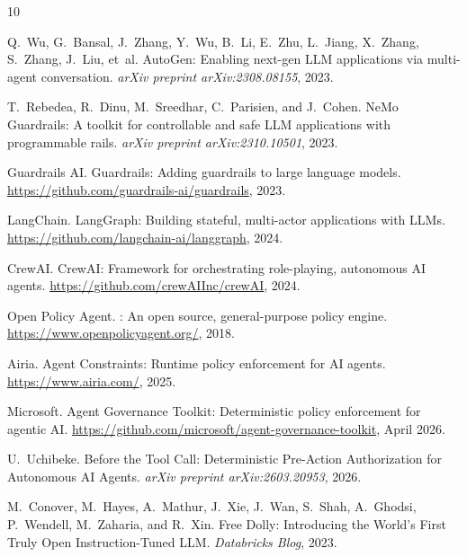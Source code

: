 \documentclass[11pt,a4paper]{article}
\begin{document}


\begin{thebibliography}{10}

Q.~Wu, G.~Bansal, J.~Zhang, Y.~Wu, B.~Li, E.~Zhu, L.~Jiang, X.~Zhang,
  S.~Zhang, J.~Liu, et~al.
\newblock Auto{G}en: Enabling next-gen {LLM} applications via multi-agent
  conversation.
\newblock \emph{arXiv preprint arXiv:2308.08155}, 2023.

T.~Rebedea, R.~Dinu, M.~Sreedhar, C.~Parisien, and J.~Cohen.
\newblock Ne{M}o {G}uardrails: A toolkit for controllable and safe {LLM}
  applications with programmable rails.
\newblock \emph{arXiv preprint arXiv:2310.10501}, 2023.

{Guardrails AI}.
\newblock Guardrails: Adding guardrails to large language models.
\newblock \url{https://github.com/guardrails-ai/guardrails}, 2023.

{LangChain}.
\newblock Lang{G}raph: Building stateful, multi-actor applications with {LLMs}.
\newblock \url{https://github.com/langchain-ai/langgraph}, 2024.

{CrewAI}.
\newblock Crew{AI}: Framework for orchestrating role-playing, autonomous {AI}
  agents.
\newblock \url{https://github.com/crewAIInc/crewAI}, 2024.

{Open Policy Agent}.
: An open source, general-purpose policy engine.
\newblock \url{https://www.openpolicyagent.org/}, 2018.

{Airia}.
\newblock Agent Constraints: Runtime policy enforcement for AI agents.
\newblock \url{https://www.airia.com/}, 2025.

{Microsoft}.
\newblock Agent Governance Toolkit: Deterministic policy enforcement for
  agentic {AI}.
\newblock \url{https://github.com/microsoft/agent-governance-toolkit}, April 2026.

U.~Uchibeke.
\newblock Before the Tool Call: Deterministic Pre-Action Authorization for
  Autonomous {AI} Agents.
\newblock \emph{arXiv preprint arXiv:2603.20953}, 2026.

M.~Conover, M.~Hayes, A.~Mathur, J.~Xie, J.~Wan, S.~Shah, A.~Ghodsi,
  P.~Wendell, M.~Zaharia, and R.~Xin.
\newblock Free Dolly: Introducing the World's First Truly Open
  Instruction-Tuned {LLM}.
\newblock \emph{Databricks Blog}, 2023.


\end{thebibliography}
\end{document}
